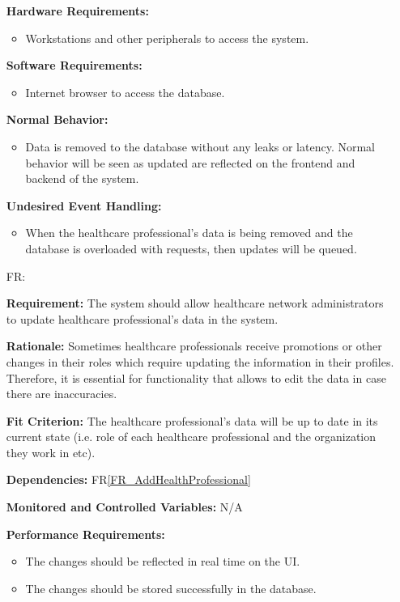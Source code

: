\documentclass[12pt]{article}
\newcounter{reqnum} %
\begin{document}
\begin{itemize}
  \textbf{Hardware Requirements:}
  \begin{itemize}
    \item Workstations and other peripherals to access the system.
  \end{itemize} 
  
  \textbf{Software Requirements:}
  \begin{itemize}
    \item Internet browser to access the database.
  \end{itemize} 
  
  \textbf{Normal Behavior:}
  \begin{itemize}
    \item Data is removed to the database without any leaks or latency. Normal behavior will be seen as updated are reflected on the frontend and backend of the system.
  \end{itemize} 
  
  \textbf{Undesired Event Handling:}
  \begin{itemize}
    \item When the healthcare professional's data is being removed and the database is overloaded with requests, then updates will be queued.
  \end{itemize} 
  
  \item[FR\refstepcounter{reqnum}\thereqnum \label{FR_UpdateHealthProfessionals}:]
  
  \textbf{Requirement:} The system should allow healthcare network administrators to update healthcare professional's data in the system.
  
  \textbf{Rationale:} Sometimes healthcare professionals receive promotions or other changes in their roles which require updating the information in their profiles. Therefore, it is essential for functionality that allows to edit the data in case there are inaccuracies.  
  
  \textbf{Fit Criterion:} The healthcare professional's data will be up to date in its current state (i.e. role of each healthcare professional and the organization they work in etc). 
  
  \textbf{Dependencies:} FR\ref{FR_AddHealthProfessional}
  
  \textbf{Monitored and Controlled Variables:} N/A
  
  \textbf{Performance Requirements:} 
  \begin{itemize}
    \item The changes should be reflected in real time on the UI.
    \item The changes should be stored successfully in the database.
  \end{itemize} 
  

\end{itemize}
\end{document}
